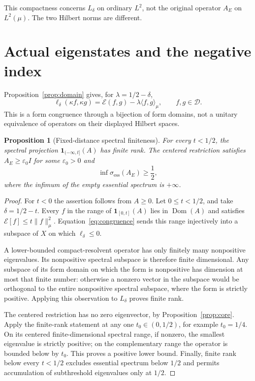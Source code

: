 \documentclass[11pt,a4paper]{article}
\numberwithin{equation}{section}
\newtheorem{proposition}[theorem]{Proposition}
\theoremstyle{remark}
\newcommand{\E}{\mathcal E}
\newcommand{\D}{\mathcal D}
\newcommand{\dom}{\operatorname{Dom}}
\newcommand{\ess}{\operatorname{ess}}
\newcommand{\ip}[2]{\langle #1,#2\rangle}
\newcommand{\norm}[1]{\lVert #1\rVert}
\newcommand{\one}{\mathbf 1}
\begin{document}
This compactness concerns $L_\delta$ on ordinary $L^2$, not the original operator $A_E$ on $L^2(\mu)$. The two Hilbert norms are different.

\section{Actual eigenstates and the negative index}\label{sec:spectrum}

Proposition~\ref{prop:domain} gives, for $\lambda=1/2-\delta$,
\begin{equation}\label{eq:congruence}
 \ell_\delta(\kappa f,\kappa g)
       =\E(f,g)-\lambda\ip{f}{g}_\mu,
       \qquad f,g\in\D.
\end{equation}
This is a form congruence through a bijection of form domains, not a unitary equivalence of operators on their displayed Hilbert spaces.

\begin{proposition}[Fixed-distance spectral finiteness]\label{prop:finite}
For every $t<1/2$, the spectral projection $\one_{(-\infty,t]}(A)$ has finite rank. The centered restriction satisfies $A_E\ge\varepsilon_0 I$ for some $\varepsilon_0>0$ and
\begin{equation}\label{eq:essential}
 \inf\sigma_{\ess}(A_E)\ge\frac12,
\end{equation}
where the infimum of the empty essential spectrum is $+\infty$.
\end{proposition}
\begin{proof}
For $t<0$ the assertion follows from $A\ge0$. Let $0\le t<1/2$, and take $\delta=1/2-t$. Every $f$ in the range of $\one_{[0,t]}(A)$ lies in $\dom(A)$ and satisfies $\E[f]\le t\norm{f}_\mu^2$. Equation~\eqref{eq:congruence} sends this range injectively into a subspace of $X$ on which $\ell_\delta\le0$.

A lower-bounded compact-resolvent operator has only finitely many nonpositive eigenvalues. Its nonpositive spectral subspace is therefore finite dimensional. Any subspace of its form domain on which the form is nonpositive has dimension at most that finite number: otherwise a nonzero vector in the subspace would be orthogonal to the entire nonpositive spectral subspace, where the form is strictly positive. Applying this observation to $L_\delta$ proves finite rank.

The centered restriction has no zero eigenvector, by Proposition~\ref{prop:core}. Apply the finite-rank statement at any one $t_0\in(0,1/2)$, for example $t_0=1/4$. On its centered finite-dimensional spectral range, if nonzero, the smallest eigenvalue is strictly positive; on the complementary range the operator is bounded below by $t_0$. This proves a positive lower bound. Finally, finite rank below every $t<1/2$ excludes essential spectrum below $1/2$ and permits accumulation of subthreshold eigenvalues only at $1/2$.
\end{proof}
\end{document}
